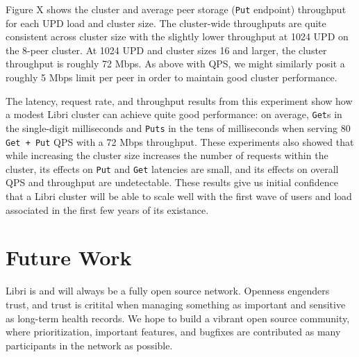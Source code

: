 \documentclass[10pt]{article}
\newcommand{\ttt}[1]{\texttt{#1}}
\begin{document}
Figure X shows the cluster and average peer storage (\ttt{Put} endpoint) throughput for each UPD load and cluster size. The cluster-wide throughputs are quite consistent across cluster size with the slightly lower throughput at 1024 UPD on the 8-peer cluster. At 1024 UPD and cluster sizes 16 and larger, the cluster throughput is roughly 72 Mbps. As above with QPS, we might similarly posit a roughly 5 Mbps limit per peer in order to maintain good cluster performance.

The latency, request rate, and throughput results from this experiment show how a modest Libri cluster can achieve quite good performance: on average, \ttt{Get}s in the single-digit milliseconds and \texttt{Puts} in the tens of milliseconds when serving 80 \texttt{Get + Put} QPS with a 72 Mbps throughput. These experiments also showed that while increasing the cluster size increases the number of requests within the cluster, its effects on \texttt{Put} and \texttt{Get} latencies are small, and its effects on overall QPS and throughput are undetectable. These results give us initial confidence that a Libri cluster will be able to scale well with the first wave of users and load associated in the first few years of its existance.


\section{Future Work}
\label{sec:future}

Libri is and will always be a fully open source network. Openness engenders trust, and trust is critital when managing something as important and sensitive as long-term health records. We hope to build a vibrant open source community, where prioritization, important features, and bugfixes are contributed as many participants in the network as possible. 
\end{document}
